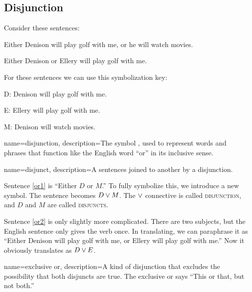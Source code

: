 
\subsection{Disjunction}
Consider these sentences:
\begin{earg}
\item[\ex{or1}]Either Denison will play golf with me, or he will watch movies.
\item[\ex{or2}]Either Denison or Ellery will play golf with me.
\end{earg}

For these sentences we can use this symbolization key:

\begin{ekey}
\item[D:] Denison will play golf with me.
\item[E:] Ellery will play golf with me.
\item[M:] Denison will watch movies.
\end{ekey}

{
name=disjunction,
description={The symbol \eor, used to represent words and phrases that function like the English word ``or'' in its inclusive sense.}
}

{
name=disjunct,
description={A sentences joined to another by a disjunction.}
}



Sentence \ref{or1} is ``Either $D$ or $M$.'' To fully symbolize this, we introduce a new symbol. The sentence becomes $D \lor M$. The $\lor$ connective is called \textsc{\gls{disjunction}}, \label{def:disjunction} and $D$ and $M$ are called \textsc{\glspl{disjunct}}. \label{def:disjunct}

Sentence \ref{or2} is only slightly more complicated. There are two subjects, but the English sentence only gives the verb once. In translating, we can paraphrase it as ``Either Denison will play golf with me, or Ellery will play golf with me.'' Now it obviously translates as $D \lor E$.




{
name=exclusive or,
description={A kind of disjunction that excludes the possibility that both disjuncts are true. The exclusive or says ``This or that, but not both.''}
}


